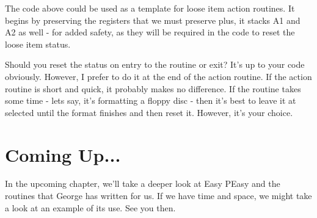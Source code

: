 The code above could be used as a template for loose item action
    routines. It begins by preserving the registers that we must preserve
    plus, it stacks A1 and A2 as well -{} for added safety, as they will be
    required in the code to reset the loose item status.

Should you reset the status on entry to the routine or exit? It's up
    to your code obviously. However, I prefer to do it at the end of the
    action routine. If the action routine is short and quick, it probably
    makes no difference. If the routine takes some time -{} lets say, it's
    formatting a floppy disc -{} then it's best to leave it at selected until
    the format finishes and then reset it. However, it's your choice.

\section{Coming Up...}

In the upcoming chapter, we'll take a deeper look at
    Easy PEasy and the routines that George has written for us. If we have
    time and space, we might take a look at an example of its use. See you
    then.

